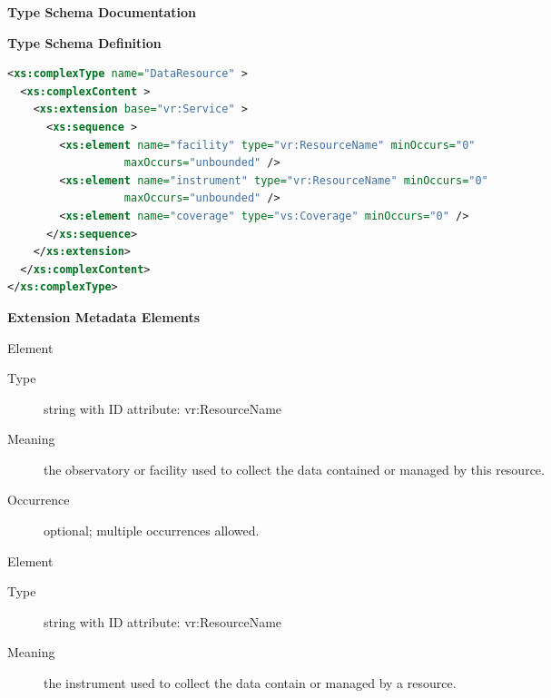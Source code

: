\documentclass[11pt,a4paper]{ivoa}
\begin{document}
\begin{generated}
\begingroup
      	\renewcommand*\descriptionlabel[1]{%
      	\hbox to 5.5em{\emph{#1}\hfil}}\vspace{2ex}\noindent\textbf{ Type Schema Documentation}



\vspace{1ex}\noindent\textbf{ Type Schema Definition}

\begin{lstlisting}[language=XML,basicstyle=\footnotesize]
<xs:complexType name="DataResource" >
  <xs:complexContent >
    <xs:extension base="vr:Service" >
      <xs:sequence >
        <xs:element name="facility" type="vr:ResourceName" minOccurs="0"
                  maxOccurs="unbounded" />
        <xs:element name="instrument" type="vr:ResourceName" minOccurs="0"
                  maxOccurs="unbounded" />
        <xs:element name="coverage" type="vs:Coverage" minOccurs="0" />
      </xs:sequence>
    </xs:extension>
  </xs:complexContent>
</xs:complexType>
\end{lstlisting}

\vspace{0.5ex}\noindent\textbf{ Extension Metadata Elements}

\begingroup\small\begin{bigdescription}\item[Element \xmlel{facility}]
\begin{description}
\item[Type] string with ID attribute: vr:ResourceName
\item[Meaning] 
                     the observatory or facility used to collect the data 
                     contained or managed by this resource.  
                   
\item[Occurrence] optional; multiple occurrences allowed.

\end{description}
\item[Element \xmlel{instrument}]
\begin{description}
\item[Type] string with ID attribute: vr:ResourceName
\item[Meaning] 
                     the instrument used to collect the data contain or 
                     managed by a resource.  
                   

\end{description}
\end{bigdescription}
\end{generated}
\end{document}

